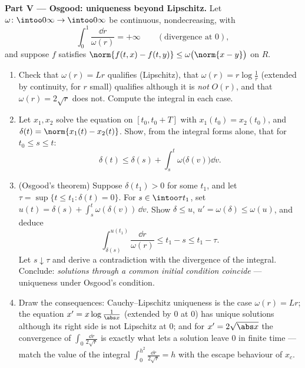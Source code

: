 \begin{problem}[{Weekend problem --- existence of solutions of
$x' = f(t, x)$ without Lipschitz}]
\medskip
\noindent\textbf{Part V --- Osgood: uniqueness beyond
Lipschitz.} Let $\omega\colon\intoo0\infty\to\intoo0\infty$ be
continuous, nondecreasing, with
\[
\int_0^1\frac{\dd r}{\omega(r)} = +\infty
\qquad(\text{divergence at } 0),
\]
and suppose $f$ satisfies $\norm{f(t, x) - f(t, y)} \leq
\omega\bigl(\norm{x - y}\bigr)$ on $R$.
\begin{enumerate}[resume]
  \item Check that $\omega(r) = Lr$ qualifies (Lipschitz), that
        $\omega(r) = r\log\frac1r$ (extended by continuity, for
        $r$ small) qualifies although it is \emph{not} $O(r)$,
        and that $\omega(r) = 2\sqrt r$ does not. Compute the
        integral in each case.
  \item Let $x_1, x_2$ solve the equation on $[t_0, t_0 + T]$
        with $x_1(t_0) = x_2(t_0)$, and $\delta(t) =
        \norm{x_1(t) - x_2(t)}$. Show, from the integral forms
        alone, that for $t_0 \leq s \leq t$:
        \[
        \delta(t) \leq \delta(s) +
        \int_s^t\omega\bigl(\delta(v)\bigr)\dd v .
        \]
  \item (Osgood's theorem) Suppose $\delta(t_1) > 0$ for some
        $t_1$, and let $\tau = \sup\{t \leq t_1 : \delta(t) =
        0\}$. For $s \in \intoo\tau{t_1}$, set $u(t) = \delta(s)
        + \int_s^t\omega(\delta(v))\,\dd v$. Show $\delta \leq
        u$, $u' = \omega(\delta) \leq \omega(u)$, and deduce
        \[
        \int_{\delta(s)}^{u(t_1)}\frac{\dd r}{\omega(r)}
        \leq t_1 - s \leq t_1 - \tau .
        \]
        Let $s \downarrow \tau$ and derive a contradiction with
        the divergence of the integral. Conclude:
        \emph{solutions through a common initial condition
        coincide} --- uniqueness under Osgood's condition.
  \item Draw the consequences: Cauchy--Lipschitz uniqueness is
        the case $\omega(r) = Lr$; the equation $x' =
        x\log\frac1{\abs x}$ (extended by $0$ at $0$) has unique
        solutions although its right side is not Lipschitz at
        $0$; and for $x' = 2\sqrt{\abs x}$ the convergence of
        $\int_0\frac{\dd r}{2\sqrt r}$ is exactly what lets a
        solution leave $0$ in finite time --- match the value of
        the integral $\int_0^{h^2}\frac{\dd r}{2\sqrt r} = h$
        with the escape behaviour of $x_c$.
\end{enumerate}


\end{problem}
